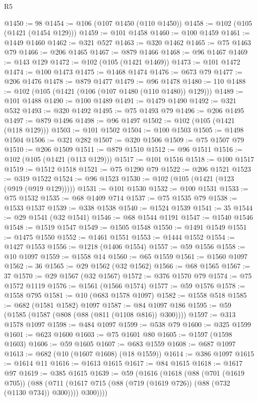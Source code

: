 \begin{lexlean}{R5}
\begin{coremodule}
@1450 := 98
@1454 := @106 (@107 @1450 (@110 @1450))
@1458 := @102 (@105 (@1421 (@1454 @129)))
@1459 := @101 @1458
@1460 := @100 @1459
@1461 := @1449 @1460
@1462 := @321 @527
@1463 := @320 @1462
@1465 := @75 @1463 @79
@1466 := @206 @1465
@1467 := @879 @1466
@1468 := @96 @1467
@1469 := @143 @129
@1472 := @102 (@105 (@1421 @1469))
@1473 := @101 @1472
@1474 := @100 @1473
@1475 := @1468 @1474
@1476 := @673 @79
@1477 := @206 @1476
@1478 := @879 @1477
@1479 := @96 @1478
@1480 := 110
@1488 := @102 (@105 (@1421 (@106 (@107 @1480 (@110 @1480)) @129)))
@1489 := @101 @1488
@1490 := @100 @1489
@1491 := @1479 @1490
@1492 := @321 @532
@1493 := @320 @1492
@1495 := @75 @1493 @79
@1496 := @206 @1495
@1497 := @879 @1496
@1498 := @96 @1497
@1502 := @102 (@105 (@1421 (@118 @129)))
@1503 := @101 @1502
@1504 := @100 @1503
@1505 := @1498 @1504
@1506 := @321 @282
@1507 := @320 @1506
@1509 := @75 @1507 @79
@1510 := @206 @1509
@1511 := @879 @1510
@1512 := @96 @1511
@1516 := @102 (@105 (@1421 (@113 @129)))
@1517 := @101 @1516
@1518 := @100 @1517
@1519 := @1512 @1518
@1521 := @75 @1290 @79
@1522 := @206 @1521
@1523 := @319 @1522
@1524 := @96 @1523
@1530 := @102 (@105 (@1421 (@123 (@919 (@919 @129)))))
@1531 := @101 @1530
@1532 := @100 @1531
@1533 := @75 @1532
@1535 := @68 @1409 @714
@1537 := @75 @1535 @79
@1538 := @1533 @1537
@1539 := @338 @1538
@1540 := @1524 @1539
@1541 := 35
@1544 := @29 @1541 (@32 @1541)
@1546 := @68 @1544 @1191
@1547 := @1540 @1546
@1548 := @1519 @1547
@1549 := @1505 @1548
@1550 := @1491 @1549
@1551 := @1475 @1550
@1552 := @1461 @1551
@1553 := @1444 @1552
@1554 := @1427 @1553
@1556 := @1218 (@1406 @1554)
@1557 := @59 @1556
@1558 := @10 @1097
@1559 := @1558 @14
@1560 := @65 @1559
@1561 := @1560 @1097
@1562 := 36
@1565 := @29 @1562 (@32 @1562)
@1566 := @68 @1565
@1567 := 37
@1570 := @29 @1567 (@32 @1567)
@1572 := @376 @1570 @79
@1574 := @75 @1572 @1119
@1576 := @1561 (@1566 @1574)
@1577 := @59 @1576
@1578 := @1558 @795
@1581 := @10 (@683 @1578 @1097)
@1582 := @1558 @518
@1585 := @682 (@1581 @1582) @1097
@1587 := @84 @1097 @186
@1595 := @59 (@1585 (@1587 (@808 (@88 (@811 (@1108 @816)) @300))))
@1597 := @313 @1578 @1097
@1598 := @484 @1097
@1599 := @538 @79
@1600 := @325 @1599
@1601 := @623 @1600
@1603 := @75 @1601 @80
@1605 := @1597 (@1598 @1603)
@1606 := @59 @1605
@1607 := @683 @1559
@1608 := @687 @1097
@1613 := @682 (@10 (@1607 @1608) (@18 @1559))
@1614 := @386 @1097
@1615 := @1614 @11
@1616 := @1613 @1615
@1617 := @84 @1615
@1618 := @1617 @97
@1619 := @385 @1615
@1639 := @59
    (@1616
      (@1618
        (@88
          (@701 (@1619 @705))
          (@88 (@711 (@1617 @715 (@88 (@719 (@1619 @726)) (@88 (@732 (@1130 @734)) @300)))) @300))))

\end{coremodule}
\end{lexlean}
